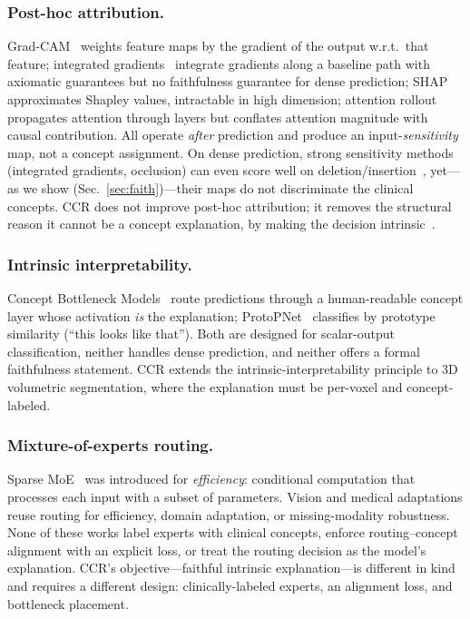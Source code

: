 \documentclass[runningheads]{llncs}
\begin{document}
\subsubsection{Post-hoc attribution.}
Grad-CAM~\cite{selvaraju2017gradcam} weights feature maps by the gradient of the output
w.r.t.\ that feature; integrated gradients~\cite{sundararajan2017ig} integrate gradients
along a baseline path with axiomatic guarantees but no faithfulness guarantee for dense
prediction; SHAP~\cite{lundberg2017shap} approximates Shapley values, intractable in high
dimension; attention rollout~\cite{abnar2020rollout} propagates attention through layers
but conflates attention magnitude with causal contribution. All operate \emph{after}
prediction and produce an input-\emph{sensitivity} map, not a concept assignment. On dense
prediction, strong sensitivity methods (integrated gradients, occlusion) can even score well on
deletion/insertion~\cite{petsiuk2018rise}, yet---as we show (Sec.~\ref{sec:faith})---their maps
do not discriminate the clinical concepts. CCR does not improve post-hoc attribution; it removes
the structural reason it cannot be a concept explanation, by making the decision
intrinsic~\cite{rudin2019stop}.

\subsubsection{Intrinsic interpretability.}
Concept Bottleneck Models~\cite{koh2020cbm} route predictions through a human-readable
concept layer whose activation \emph{is} the explanation; ProtoPNet~\cite{chen2019protopnet}
classifies by prototype similarity (``this looks like that''). Both are designed for
scalar-output classification, neither handles dense prediction, and neither offers a formal
faithfulness statement. CCR extends the intrinsic-interpretability principle to 3D
volumetric segmentation, where the explanation must be per-voxel and concept-labeled.

\subsubsection{Mixture-of-experts routing.}
Sparse MoE~\cite{shazeer2017moe,fedus2022switch,riquelme2021vmoe} was introduced for
\emph{efficiency}: conditional computation that processes each input with a subset of
parameters. Vision and medical adaptations reuse routing for efficiency, domain adaptation,
or missing-modality robustness. None of these works label experts with clinical concepts,
enforce routing--concept alignment with an explicit loss, or treat the routing decision as
the model's explanation. CCR's objective---faithful intrinsic explanation---is different in
kind and requires a different design: clinically-labeled experts, an alignment loss, and
bottleneck placement.
\end{document}
